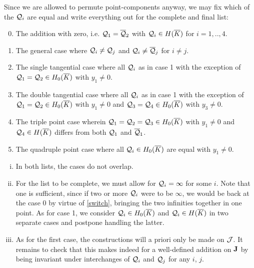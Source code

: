 \documentclass[english,11pt,a4paper]{article}
\begin{document}
Since we are allowed to permute point-components anyway, we may fix which of the $\mathcal{Q}_i$ are equal and write everything out for the complete and final list:

\vspace{-3mm}
\fline
\begin{enumerate}\setcounter{enumi}{-1}
  \parskip 1mm
  \item The addition with zero, i.e. $\mathcal{Q}_1 = \overline {\mathcal{Q}}_2$ with $\mathcal{Q}_i \in H(\overline K)$ for $i = 1,..,4$.
  \item The general case where $\mathcal{Q}_i \neq \mathcal{Q}_j$ and $\mathcal{Q}_i \neq \overline {\mathcal{Q}}_j$ for $i \neq j$.
  \item The single tangential case where all $\mathcal{Q}_i$ as in case 1 with the exception of $\mathcal{Q}_1 = \mathcal{Q}_2 \in H_0(\overline K)$ with $y_1 \neq 0$.%
  \item The double tangential case where all $\mathcal{Q}_i$ as in case 1 with the exception of $\mathcal{Q}_1 = \mathcal{Q}_2 \in H_0(\overline K)$ with $y_1 \neq 0$ and $\mathcal{Q}_3 = \mathcal{Q}_4 \in H_0(\overline K)$ with $y_3 \neq 0$.%
  \item The triple point case wherein $\mathcal{Q}_1=\mathcal{Q}_2=\mathcal{Q}_3 \in H_0(\overline K)$ with $y_1 \neq 0$ and $\mathcal{Q}_4 \in H(\overline K)$ differs from both $\mathcal{Q}_1$ and $\overline {\mathcal{Q}}_1$.
  \item The quadruple point case where all $\mathcal{Q}_i \in H_0(\overline K)$ are equal with $y_1\neq 0$.
\end{enumerate}
\vspace{-2mm}
\fline
\parskip 3mm

\begin{remark}\label{rem}\hfill
\begin{enumerate}[(i)]
  \item In both lists, the cases do not overlap.
  
  \item For the list to be complete, we must allow for $\mathcal{Q}_i = \infty$ for some $i$. Note that one is sufficient, since if two or more $\mathcal{Q}_i$ were to be $\infty$, we would be back at the case 0 by virtue of \eqref{switch}, bringing the two infinities together in one point. As for case 1, we consider $\mathcal{Q}_i \in H_0(\overline K)$ and $\mathcal{Q}_i \in H(\overline K)$ in two separate cases and postpone handling the latter.\label{extend}

  \item As for the first case, the constructions will a priori only be made on $\mathcal{J}$. It remains to check that this makes indeed for a well-defined addition on $\mathbf{J}$ by being invariant under interchanges of $\mathcal{Q}_i$ and $\mathcal{Q}_j$ for any $i$, $j$.
\end{enumerate}
\end{remark}
\end{document}
